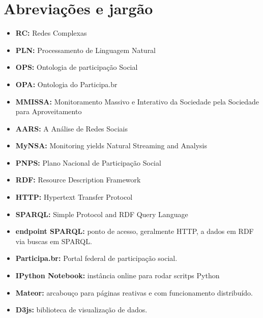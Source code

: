 \section*{Abreviações e jargão}
\begin{itemize}[label={}]
    \item {\bf RC:              } Redes Complexas
    \item {\bf PLN:             } Processamento de Linguagem Natural
    \item {\bf OPS:             } Ontologia de participação Social
    \item {\bf OPA:             } Ontologia do Participa.br
    \item {\bf MMISSA:          } Monitoramento Massivo e Interativo da Sociedade pela Sociedade para Aproveitamento
    \item {\bf AARS:            } A Análise de Redes Sociais
    \item {\bf MyNSA:           } Monitoring yields Natural Streaming and Analysis
    \item {\bf PNPS:            } Plano Nacional de Participação Social
    \item {\bf RDF:             } Resource Description Framework
    \item {\bf HTTP:            } Hypertext Transfer Protocol
    \item {\bf SPARQL:          } Simple Protocol and RDF Query Language
    \item {\bf endpoint SPARQL: } ponto de acesso, geralmente HTTP, a dados em RDF via buscas em SPARQL.
    \item {\bf Participa.br:    } Portal federal de participação social.
    \item {\bf IPython Notebook:} instância online para rodar scritps Python
    \item {\bf Mateor:          } arcabouço para páginas reativas e com funcionamento distribuído.
    \item {\bf D3js:            } biblioteca de visualização de dados.
\end{itemize}
